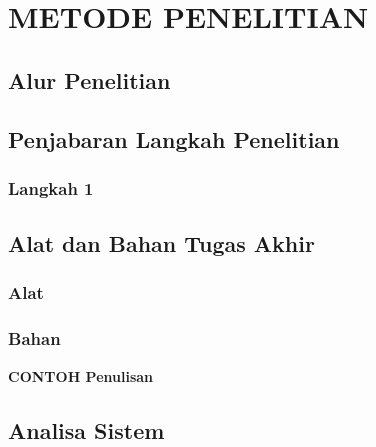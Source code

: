 \chapter{METODE PENELITIAN}

%
\vspace{4.5pt}

\begin{flushleft}
   \section{Alur Penelitian}

   \section{Penjabaran Langkah Penelitian}
   \subsection{Langkah 1}

   \section{Alat dan Bahan Tugas Akhir}
   \subsection{Alat}
   \subsection{Bahan}
\end{flushleft}

\vspace{5cm}
\noindent \textbf{CONTOH Penulisan}
\section{Analisa Sistem}

